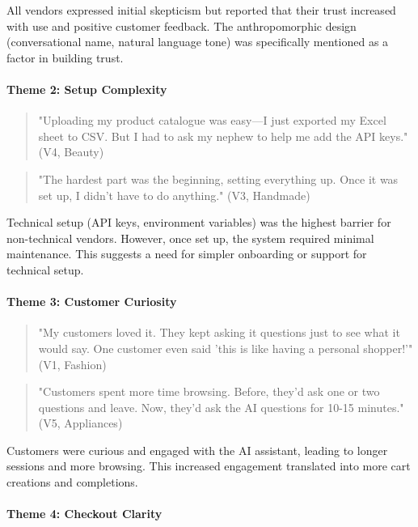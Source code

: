 \documentclass[12pt,a4paper]{article}
\begin{document}
All vendors expressed initial skepticism but reported that their trust increased with use and positive customer feedback. The anthropomorphic design (conversational name, natural language tone) was specifically mentioned as a factor in building trust.

\paragraph{Theme 2: Setup Complexity}

\begin{quote}
"Uploading my product catalogue was easy---I just exported my Excel sheet to CSV. But I had to ask my nephew to help me add the API keys." (V4, Beauty)
\end{quote}

\begin{quote}
"The hardest part was the beginning, setting everything up. Once it was set up, I didn't have to do anything." (V3, Handmade)
\end{quote}

Technical setup (API keys, environment variables) was the highest barrier for non-technical vendors. However, once set up, the system required minimal maintenance. This suggests a need for simpler onboarding or support for technical setup.

\paragraph{Theme 3: Customer Curiosity}

\begin{quote}
"My customers loved it. They kept asking it questions just to see what it would say. One customer even said 'this is like having a personal shopper!'" (V1, Fashion)
\end{quote}

\begin{quote}
"Customers spent more time browsing. Before, they'd ask one or two questions and leave. Now, they'd ask the AI questions for 10-15 minutes." (V5, Appliances)
\end{quote}

Customers were curious and engaged with the AI assistant, leading to longer sessions and more browsing. This increased engagement translated into more cart creations and completions.

\paragraph{Theme 4: Checkout Clarity}
\end{document}

